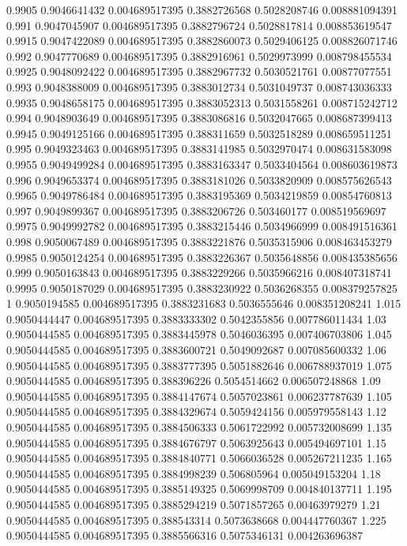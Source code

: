 {0.9905 0.9046641432 0.004689517395 0.3882726568 0.5028208746 0.008881094391
0.991 0.9047045907 0.004689517395 0.3882796724 0.5028817814 0.008853619547
0.9915 0.9047422089 0.004689517395 0.3882860073 0.5029406125 0.008826071746
0.992 0.9047770689 0.004689517395 0.3882916961 0.5029973999 0.008798455534
0.9925 0.9048092422 0.004689517395 0.3882967732 0.5030521761 0.00877077551
0.993 0.9048388009 0.004689517395 0.3883012734 0.5031049737 0.008743036333
0.9935 0.9048658175 0.004689517395 0.3883052313 0.5031558261 0.008715242712
0.994 0.9048903649 0.004689517395 0.3883086816 0.5032047665 0.008687399413
0.9945 0.9049125166 0.004689517395 0.388311659 0.5032518289 0.008659511251
0.995 0.9049323463 0.004689517395 0.3883141985 0.5032970474 0.008631583098
0.9955 0.9049499284 0.004689517395 0.3883163347 0.5033404564 0.008603619873
0.996 0.9049653374 0.004689517395 0.3883181026 0.5033820909 0.008575626543
0.9965 0.9049786484 0.004689517395 0.3883195369 0.5034219859 0.00854760813
0.997 0.9049899367 0.004689517395 0.3883206726 0.503460177 0.008519569697
0.9975 0.9049992782 0.004689517395 0.3883215446 0.5034966999 0.008491516361
0.998 0.9050067489 0.004689517395 0.3883221876 0.5035315906 0.008463453279
0.9985 0.9050124254 0.004689517395 0.3883226367 0.5035648856 0.008435385656
0.999 0.9050163843 0.004689517395 0.3883229266 0.5035966216 0.008407318741
0.9995 0.9050187029 0.004689517395 0.3883230922 0.5036268355 0.008379257825
1 0.9050194585 0.004689517395 0.3883231683 0.5036555646 0.008351208241
1.015 0.9050444447 0.004689517395 0.3883333302 0.5042355856 0.007786011434
1.03 0.9050444585 0.004689517395 0.3883445978 0.5046036395 0.007406703806
1.045 0.9050444585 0.004689517395 0.3883600721 0.5049092687 0.007085600332
1.06 0.9050444585 0.004689517395 0.3883777395 0.5051882646 0.006788937019
1.075 0.9050444585 0.004689517395 0.388396226 0.5054514662 0.006507248868
1.09 0.9050444585 0.004689517395 0.3884147674 0.5057023861 0.006237787639
1.105 0.9050444585 0.004689517395 0.3884329674 0.5059424156 0.005979558143
1.12 0.9050444585 0.004689517395 0.3884506333 0.5061722992 0.005732008699
1.135 0.9050444585 0.004689517395 0.3884676797 0.5063925643 0.005494697101
1.15 0.9050444585 0.004689517395 0.3884840771 0.5066036528 0.005267211235
1.165 0.9050444585 0.004689517395 0.3884998239 0.506805964 0.005049153204
1.18 0.9050444585 0.004689517395 0.3885149325 0.5069998709 0.004840137711
1.195 0.9050444585 0.004689517395 0.3885294219 0.5071857265 0.00463979279
1.21 0.9050444585 0.004689517395 0.388543314 0.5073638668 0.004447760367
1.225 0.9050444585 0.004689517395 0.3885566316 0.5075346131 0.004263696387
}
